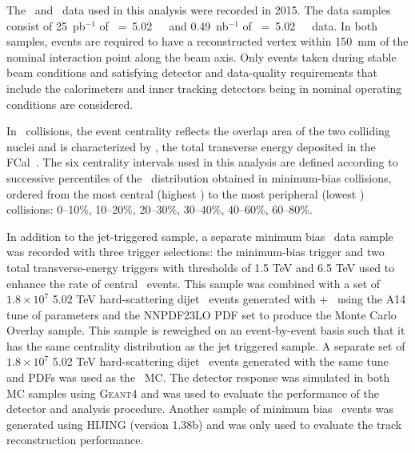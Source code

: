 
The \PbPb\ and \pp\ data used in this analysis were recorded in 2015.
 The data samples consist of 25~pb$^{-1}$ of \sqrts~=~5.02~\TeV\ \pp\ and 0.49~nb$^{-1}$ of \sqrtsnn~=~5.02~\TeV\
\pbpb\ data. In both samples, events are required to have a reconstructed vertex
within 150~mm of the nominal interaction point along the beam axis.
Only events taken during stable beam conditions and satisfying detector and data-quality requirements that include the calorimeters and inner tracking detectors being in nominal operating conditions are considered. 



In \PbPb\ collisions, the event centrality reflects the overlap area of the two colliding nuclei and is characterized by \ETfcal, the total transverse energy deposited in the 
FCal~\cite{Aaboud:2017tql}. The six centrality intervals used in this analysis are defined according to successive percentiles of the \ETfcal\ distribution obtained in minimum-bias collisions, ordered from the most central (highest \ETfcal) to the most peripheral (lowest \ETfcal) collisions: 0--10\%, 10--20\%, 20--30\%, 30--40\%, 40--60\%, 60--80\%. 

In addition to the jet-triggered sample, a separate minimum bias \PbPb\ data sample was recorded with three trigger selections: the minimum-bias trigger and two total transverse-energy triggers with thresholds of 1.5 TeV and 6.5 TeV used to enhance the rate of central \pbpb\ events. This sample was combined with a set of $1.8\times10^7$ 5.02 TeV hard-scattering dijet \pp\ events generated with \powheg{}+\pythiaeight\ \cite{Nason:2004rx,Sjostrand:2014zea} using the A14 tune of parameters \cite{ATLAS2014021} and the NNPDF23LO PDF set \cite{Ball:2012cx} to produce the Monte Carlo Overlay sample. This sample is reweighed on an event-by-event basis such that it has the same centrality distribution as the jet triggered sample.
A separate set of $1.8\times10^7$ 5.02 TeV hard-scattering dijet \pp\ events generated with the same tune and PDFs was used as the \pp\ MC. The detector response was simulated in both MC samples using \textsc{Geant4} \cite{Agostinelli:2002hh,Aad:2010ah} and was used to evaluate the performance of the detector and analysis procedure. Another sample of minimum bias \pbpb\ events was generated using HIJING (version 1.38b) \cite{Aad:2010ah} and was only used to evaluate the track reconstruction performance. 	


